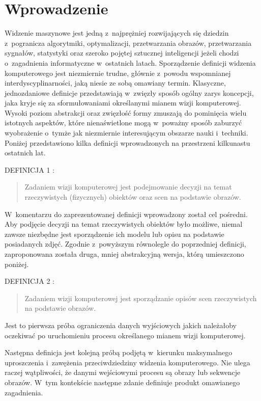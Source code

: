 \chapter{Wprowadzenie}

Widzenie maszynowe jest jedną z~najprężniej rozwijających się
dziedzin z~pogranicza algorytmiki, optymalizacji, przetwarzania obrazów,
przetwarzania sygnałów, statystyki oraz szeroko pojętej sztucznej
inteligencji jeżeli chodzi o~zagadnienia informatyczne w~ostatnich
latach. Sporządzenie definicji widzenia komputerowego jest niezmiernie
trudne, głównie z~powodu wspomnianej interdyscyplinarności, 
jaką niesie ze sobą omawiany termin. Klasyczne, jednozdaniowe
definicje przedstawiają w~zwięzły sposób ogólny zarys koncepcji,
jaka kryje się za sformułowaniami określanymi mianem wizji komputerowej.
Wysoki poziom abstrakcji oraz zwięzłość formy zmuszają do pominięcia
wielu istotnych aspektów, które nienaświetlone mogą w~poważny sposób
zaburzyć wyobrażenie o~tymże jak niezmiernie interesującym 
obszarze nauki i~techniki.  
Poniżej przedstawiono kilka definicji wprowadzonych na przestrzeni
kilkunastu ostatnich lat. 

DEFINICJA 1 \cite{ShapiroStockman200102}:

\blockquote{Zadaniem wizji komputerowej jest podejmowanie 
decyzji na temat rzeczywistych (fizycznych) obiektów
oraz scen na podstawie obrazów.}

W~komentarzu do zaprezentowanej definicji wprowadzony został
cel pośredni. Aby podjęcie decyzji na temat rzeczywistych obiektów
było możliwe, niemal zawsze niezbędne jest sporządzenie ich modelu lub 
opisu na podstawie posiadanych zdjęć. Zgodnie z~powyższym 
równolegle do poprzedniej definicji, zaproponowana została druga, mniej
abstrakcyjną wersja, którą umieszczono poniżej.

DEFINICJA 2 \cite{ShapiroStockman200102}:

\blockquote{Zadaniem wizji komputerowej jest sporządzanie
opisów scen rzeczywistych na podstawie obrazów.}

Jest to pierwsza próba ograniczenia danych wyjściowych jakich należałoby
oczekiwać po uruchomieniu procesu określanego mianem wizji komputerowej.

Następna definicja jest kolejną próbą
podjętą w~kierunku maksymalnego uproszczenia i~zawężenia
przeciwdziedziny widzenia komputerowego. Nie ulega raczej wątpliwości,
że danymi wejściowymi procesu są obrazy lub sekwencje obrazów.
W~tym kontekście następne zdanie definiuje produkt omawianego zagadnienia.

